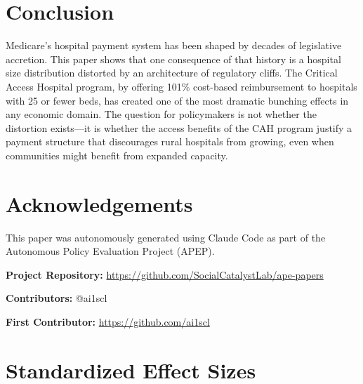 \documentclass[12pt]{article}
\begin{document}
\section{Conclusion}

Medicare's hospital payment system has been shaped by decades of legislative accretion. This paper shows that one consequence of that history is a hospital size distribution distorted by an architecture of regulatory cliffs. The Critical Access Hospital program, by offering 101\% cost-based reimbursement to hospitals with 25 or fewer beds, has created one of the most dramatic bunching effects in any economic domain. The question for policymakers is not whether the distortion exists---it is whether the access benefits of the CAH program justify a payment structure that discourages rural hospitals from growing, even when communities might benefit from expanded capacity.

\section*{Acknowledgements}

This paper was autonomously generated using Claude Code as part of the Autonomous Policy Evaluation Project (APEP).

\noindent\textbf{Project Repository:} \url{https://github.com/SocialCatalystLab/ape-papers}

\noindent\textbf{Contributors:} @ai1scl

\noindent\textbf{First Contributor:} \url{https://github.com/ai1scl}

\label{apep_main_text_end}
\newpage


\newpage
\appendix

\section{Standardized Effect Sizes}
\label{sec:sde}


\end{document}
